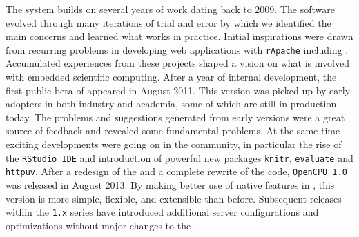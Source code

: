 
The \OpenCPU system builds on several years of work dating back to 2009. The software evolved through many iterations of trial and error by which we identified the main concerns and learned what works in practice. Initial inspirations were drawn from recurring problems in developing \R web applications with \texttt{rApache} including \cite{van2009stage}. Accumulated experiences from these projects shaped a vision on what is involved with embedded scientific computing. After a year of internal development, the first public beta of \OpenCPU appeared in August 2011. This version was picked up by early adopters in both industry and academia, some of which are still in production today. The problems and suggestions generated from early versions were a great source of feedback and revealed some fundamental problems. At the same time exciting developments were going on in the \R community, in particular the rise of the \texttt{RStudio IDE} and introduction of powerful new \R packages \texttt{knitr}, \texttt{evaluate} and \texttt{httpuv}. After a redesign of the \API and a complete rewrite of the code, \texttt{OpenCPU 1.0} was released in August 2013. By making better use of native features in \HTTP, this version is more simple, flexible, and extensible than before. Subsequent releases within the \texttt{1.x} series have introduced additional server configurations and optimizations without major changes to the \API.




